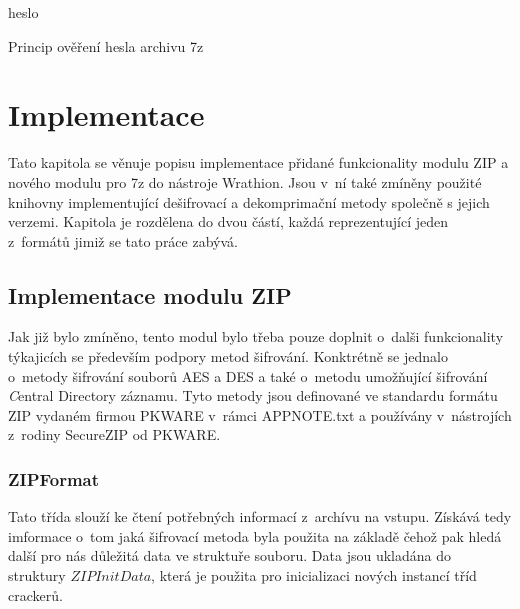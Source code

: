 \begin{algorithm}[!h]
    \SetStartEndCondition{ (}{)}{)}\SetAlgoBlockMarkers{}{}%
    \AlgoDisplayBlockMarkers\SetAlgoNoLine%
    \DontPrintSemicolon
    \Return heslo\;
    \caption{Princip ověření hesla archivu 7z}
    \label{alg:7z_desifr}
\end{algorithm}
    
\chapter{Implementace}
\label{ch:implementace}
Tato kapitola se věnuje popisu implementace přidané funkcionality modulu ZIP a nového modulu pro
7z do nástroje Wrathion. Jsou v~ní také zmíněny použité knihovny implementující dešifrovací a
dekomprimační metody společně s jejich verzemi. Kapitola je rozdělena do dvou částí, každá
reprezentující jeden z~formátů jimiž se tato práce zabývá.

\section{Implementace modulu ZIP}
Jak již bylo zmíněno, tento modul bylo třeba pouze doplnit o~dalši funkcionality týkajicích se 
především podpory metod šifrování. Konktrétně se jednalo o~metody šifrování souborů AES a DES a také
o~metodu umožňující šifrování {\textit Central Directory} záznamu. Tyto metody jsou definované ve
standardu formátu ZIP vydaném firmou PKWARE v~rámci APPNOTE.txt a používány
v~nástrojích z~rodiny SecureZIP od PKWARE.

\subsection{ZIPFormat}
Tato třída slouží ke čtení potřebných informací z~archívu na vstupu. Získává tedy imformace o~tom
jaká šifrovací metoda byla použita na základě čehož pak hledá další pro nás důležitá data ve
struktuře souboru. Data jsou ukladána do struktury $ZIPInitData$, která je použita pro
inicializaci nových instancí tříd crackerů. 

